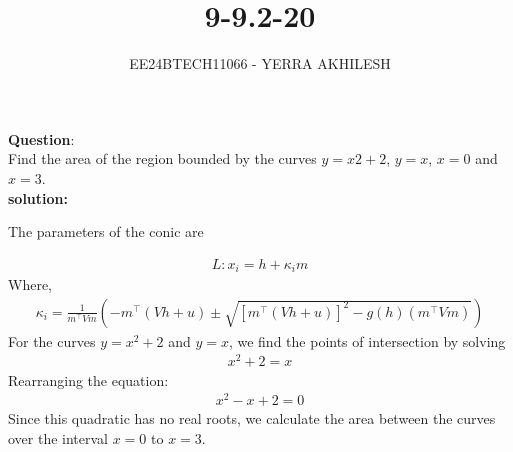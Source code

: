 \documentclass[journal]{IEEEtran}
\begin{document}

\vspace{3cm}

\title{9-9.2-20}
\author{EE24BTECH11066 - YERRA AKHILESH
}
{\let\newpage\relax\maketitle}

\renewcommand{\thefigure}{\theenumi}
\renewcommand{\thetable}{\theenumi}
\setlength{\intextsep}{10pt} %


\renewcommand{\thetable}{\theenumi}
\textbf{Question}:\\
Find the area of the region bounded by the curves $y = x2 + 2$, $y = x$, $x = 0$ and $x = 3$.
\\
\textbf{solution: }
\begin{table}[h!]
    \centering
    
\end{table}
The parameters of the conic are\\
\begin{table}[h!]
    \centering
    
    \label{Table2}
\end{table}

\begin{align}
    L : x_i=h+\kappa_i m 
\end{align}
Where,
\begin{align}
    \kappa_i=\frac{1}{m^\top Vm}(-m^\top(Vh+u) \pm \sqrt{[m^\top(Vh+u)]^2-g(h)(m^\top Vm)})
    \label{0.2}
\end{align}
For the curves \(y = x^2 + 2\) and \(y = x\), we find the points of intersection by solving
\begin{align}
    x^2 + 2 = x
\end{align}
Rearranging the equation:
\begin{align}
    x^2 - x + 2 = 0
\end{align}
Since this quadratic has no real roots, we calculate the area between the curves over the interval \(x = 0\) to \(x = 3\).
\end{document}
